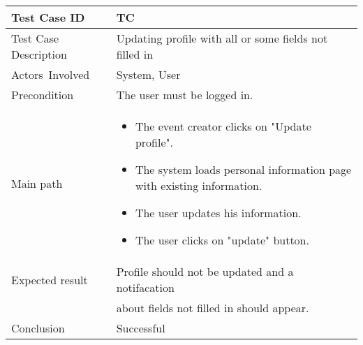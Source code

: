 \begin{center} \begin{tabular}{|l|l|}
  \hline
  Test Case ID & TC \z\\
  \hline
  Test Case Description & Updating profile with all or some fields not filled in\\
  \hline
  Actors Involved & System, User\\
   \hline
  Precondition & The user must be logged in.\\
  \hline
  Main path &   \begin{minipage}{5in}
    \vskip 4pt
            \begin{itemize}
              \item The event creator clicks on "Update profile".
              \item The system loads personal information page with existing information.
              \item The user updates his information.
              \item The user clicks on "update" button.
            \end{itemize}
    \vskip 4pt
  \end{minipage}  \\
  \hline
  Expected result & Profile should not be updated and a notifacation\\
  & about fields not filled in should appear.\\
  \hline
  Conclusion & Successful\\
  \hline
\end{tabular} \end{center}

